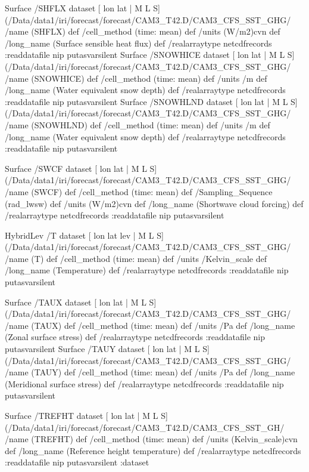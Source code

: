 \begin{ingrid}
Surface /SHFLX{
dataset
[ lon lat | M L S] (/Data/data1/iri/forecast/forecast/CAM3_T42.D/CAM3_CFS_SST_GHG/%
/name (SHFLX) def
 /cell_method (time: mean) def
 /units (W/m2)cvn def
 /long_name (Surface sensible heat flux) def
 /realarraytype netcdfrecords :readdatafile
nip
}putasvarsilent
Surface /SNOWHICE{
dataset
[ lon lat | M L S] (/Data/data1/iri/forecast/forecast/CAM3_T42.D/CAM3_CFS_SST_GHG/%
/name (SNOWHICE) def
 /cell_method (time: mean) def
 /units /m def
 /long_name (Water equivalent snow depth) def
 /realarraytype netcdfrecords :readdatafile
nip
}putasvarsilent
Surface /SNOWHLND{
dataset
[ lon lat | M L S] (/Data/data1/iri/forecast/forecast/CAM3_T42.D/CAM3_CFS_SST_GHG/%
/name (SNOWHLND) def
 /cell_method (time: mean) def
 /units /m def
 /long_name (Water equivalent snow depth) def
 /realarraytype netcdfrecords :readdatafile
nip
}putasvarsilent


Surface /SWCF{
dataset
[ lon lat | M L S] (/Data/data1/iri/forecast/forecast/CAM3_T42.D/CAM3_CFS_SST_GHG/%
/name (SWCF) def
 /cell_method (time: mean) def
 /Sampling_Sequence (rad_lwsw) def
 /units (W/m2)cvn def
 /long_name (Shortwave cloud forcing) def
 /realarraytype netcdfrecords :readdatafile
nip
}putasvarsilent

HybridLev /T{
dataset
[ lon lat lev | M L S] (/Data/data1/iri/forecast/forecast/CAM3_T42.D/CAM3_CFS_SST_GHG/%
/name (T) def
 /cell_method (time: mean) def
 /units /Kelvin_scale def
 /long_name (Temperature) def
 /realarraytype netcdfrecords :readdatafile
nip
}putasvarsilent

Surface /TAUX{
dataset
[ lon lat | M L S] (/Data/data1/iri/forecast/forecast/CAM3_T42.D/CAM3_CFS_SST_GHG/%
/name (TAUX) def
 /cell_method (time: mean) def
 /units /Pa def
 /long_name (Zonal surface stress) def
 /realarraytype netcdfrecords :readdatafile
nip
}putasvarsilent
Surface /TAUY{
dataset
[ lon lat | M L S] (/Data/data1/iri/forecast/forecast/CAM3_T42.D/CAM3_CFS_SST_GHG/%
/name (TAUY) def
 /cell_method (time: mean) def
 /units /Pa def
 /long_name (Meridional surface stress) def
 /realarraytype netcdfrecords :readdatafile
nip
}putasvarsilent

Surface /TREFHT{
dataset
[ lon lat | M L S] (/Data/data1/iri/forecast/forecast/CAM3_T42.D/CAM3_CFS_SST_GH/%
/name (TREFHT) def
 /cell_method (time: mean) def
 /units (Kelvin_scale)cvn def
 /long_name (Reference height temperature) def
 /realarraytype netcdfrecords :readdatafile
nip
}putasvarsilent
:dataset
\end{ingrid}

